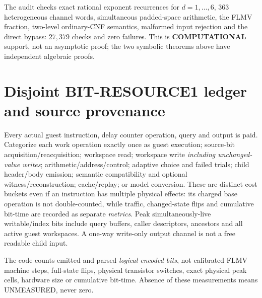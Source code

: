 \documentclass[11pt]{article}
\begin{document}
The audit checks exact rational exponent recurrences for $d=1,\dots,6$,
$363$ heterogeneous channel words, simultaneous padded-space arithmetic,
the FLMV fraction, two-level ordinary-CNF semantics, malformed input
rejection and the direct bypass: $27,379$ checks and zero failures.
This is \textbf{COMPUTATIONAL} support, not an asymptotic proof; the two
symbolic theorems above have independent algebraic proofs.

\section{Disjoint BIT-RESOURCE1 ledger and source provenance}
Every actual guest instruction, delay counter operation, query and output
is paid. Categorize each work operation exactly once as guest execution;
source-bit acquisition/reacquisition; workspace read; workspace write
\emph{including unchanged-value writes}; arithmetic/address/control;
adaptive choice and failed trials; child header/body emission; semantic
compatibility and optional witness/reconstruction; cache/replay; or model
conversion. These are distinct cost buckets even if an instruction has
multiple physical effects: its charged base operation is not double-counted,
while traffic, changed-state flips and cumulative bit-time are recorded as
separate \emph{metrics}. Peak simultaneously-live writable/index bits include
query buffers, caller descriptors, ancestors and all active guest workspaces.
A one-way write-only output channel is not a free readable child input.

The code counts emitted and parsed \emph{logical encoded bits}, not
calibrated FLMV machine steps, full-state flips, physical transistor
switches, exact physical peak cells, hardware size or cumulative bit-time.
Absence of these measurements means UNMEASURED, never zero.
\end{document}
